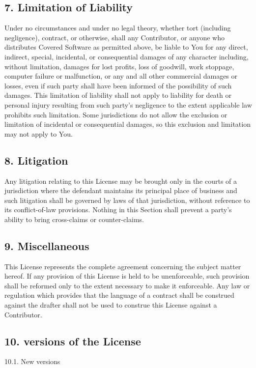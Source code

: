 \documentclass[letterpaper,10pt,english]{sphinxmanual}
\begin{document}
\subsection{7. Limitation of Liability}
\label{\detokenize{warranty:limitation-of-liability}}
Under no circumstances and under no legal theory, whether tort (including negligence), contract, or otherwise, shall any Contributor, or anyone who distributes Covered Software as permitted above, be liable to You for any direct, indirect, special, incidental, or consequential damages of any character including, without limitation, damages for lost profits, loss of goodwill, work stoppage, computer failure or malfunction, or any and all other commercial damages or losses, even if such party shall have been informed of the possibility of such damages. This limitation of liability shall not apply to liability for death or personal injury resulting from such party’s negligence to the extent applicable law prohibits such limitation. Some jurisdictions do not allow the exclusion or limitation of incidental or consequential damages, so this exclusion and limitation may not apply to You.


\subsection{8. Litigation}
\label{\detokenize{warranty:litigation}}
Any litigation relating to this License may be brought only in the courts of a jurisdiction where the defendant maintains its principal place of business and such litigation shall be governed by laws of that jurisdiction, without reference to its conflict-of-law provisions. Nothing in this Section shall prevent a party’s ability to bring cross-claims or counter-claims.


\subsection{9. Miscellaneous}
\label{\detokenize{warranty:miscellaneous}}
This License represents the complete agreement concerning the subject matter hereof. If any provision of this License is held to be unenforceable, such provision shall be reformed only to the extent necessary to make it enforceable. Any law or regulation which provides that the language of a contract shall be construed against the drafter shall not be used to construe this License against a Contributor.


\subsection{10. versions of the License}
\label{\detokenize{warranty:versions-of-the-license}}
10.1. New versions
\end{document}
